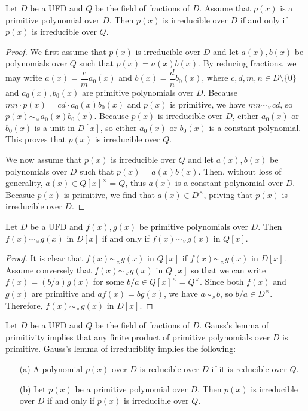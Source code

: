 \begin{thm}
    Let $D$ be a UFD and $Q$ be the field of fractions of $D$.
    Assume that $p(x)$ is a primitive polynomial over $D$.
    Then $p(x)$ is irreducible over $D$ if and only if $p(x)$ is irreducible over $Q$.
\end{thm}
\begin{proof}
    We first assume that $p(x)$ is irreducible over $D$ and let $a(x), b(x)$ be polynomials over $Q$ such that $p(x)=a(x)b(x)$.
    By reducing fractions, we may write $a(x)=\dfrac{c}{m}a_0(x)$ and $b(x)=\dfrac{d}{n}b_0(x)$, where $c, d, m, n\in D\setminus\{0\}$ and $a_0(x), b_0(x)$ are primitive polynomials over $D$.
    Because $mn\cdot p(x)=cd\cdot a_0(x)b_0(x)$ and $p(x)$ is primitive, we have $mn\sim_\times cd$, so $p(x)\sim_\times a_0(x)b_0(x)$.
    Because $p(x)$ is irreducible over $D$, either $a_0(x)$ or $b_0(x)$ is a unit in $D[x]$, so either $a_0(x)$ or $b_0(x)$ is a constant polynomial.
    This proves that $p(x)$ is irreducible over $Q$.

    We now assume that $p(x)$ is irreducible over $Q$ and let $a(x), b(x)$ be polynomials over $D$ such that $p(x)=a(x)b(x)$.
    Then, without loss of generality, $a(x)\in Q[x]^\times=Q$, thus $a(x)$ is a constant polynomial over $D$.
    Becasue $p(x)$ is primitive, we find that $a(x)\in D^\times$, priving that $p(x)$ is irreducible over $D$.
\end{proof}

\begin{cor}
    Let $D$ be a UFD and $f(x), g(x)$ be primitive polynomials over $D$.
    Then $f(x)\sim_\times g(x)$ in $D[x]$ if and only if $f(x)\sim_\times g(x)$ in $Q[x]$.
\end{cor}
\begin{proof}
    It is clear that $f(x)\sim_\times g(x)$ in $Q[x]$ if $f(x)\sim_\times g(x)$ in $D[x]$.
    Assume conversely that $f(x)\sim_\times g(x)$ in $Q[x]$ so that we can write $f(x)=(b/a)g(x)$ for some $b/a\in Q[x]^\times=Q^\times$.
    Since both $f(x)$ and $g(x)$ are primitive and $af(x)=bg(x)$, we have $a\sim_\times b$, so $b/a\in D^\times$.
    Therefore, $f(x)\sim_\times g(x)$ in $D[x]$.
\end{proof}

\begin{rmk}
    Let $D$ be a UFD and $Q$ be the field of fractions of $D$.
    Gauss's lemma of primitivity implies that any finite product of primitive polynomials over $D$ is primitive.
    Gauss's lemma of irreduciblity implies the following:
    \begin{enumerate}
        \item[(a)]
        {
            A polynomial $p(x)$ over $D$ is reducible over $D$ if it is reducible over $Q$.
        }
        \item[(b)]
        {
            Let $p(x)$ be a primitive polynomial over $D$.
            Then $p(x)$ is irreducible over $D$ if and only if $p(x)$ is irreducible over $Q$.
        }
    \end{enumerate}
\end{rmk}

